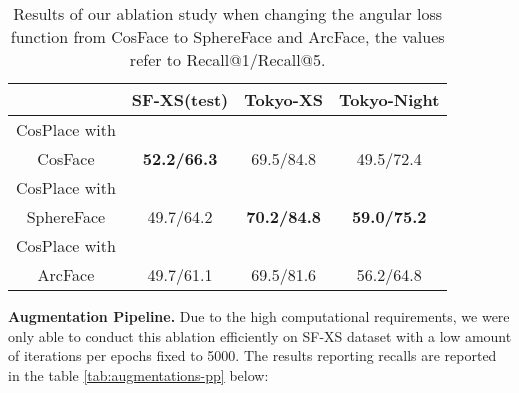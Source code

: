 \documentclass[10pt,twocolumn,letterpaper]{article}
\begin{document}
\begin{table}[htp]
  \centering
  \begin{tabular}{@{}cccc@{}}
    \toprule
     & SF-XS(test) & Tokyo-XS & Tokyo-Night\\
    \midrule
    CosPlace with\\ CosFace & \textbf{52.2/66.3} & 69.5/84.8 & 49.5/72.4 \\
    CosPlace with\\ SphereFace & 49.7/64.2 & \textbf{70.2/84.8} & \textbf{59.0/75.2} \\
    CosPlace with\\ ArcFace & 49.7/61.1 & 69.5/81.6 & 56.2/64.8\\
    \bottomrule
  \end{tabular}
  \caption{Results of our ablation study when changing the angular loss function from CosFace to SphereFace and ArcFace, the values refer to Recall@1/Recall@5.}
  \label{tab:lossablation}
\end{table}

\textbf{Augmentation Pipeline.}
Due to the high computational requirements, we were only able to conduct this ablation efficiently on SF-XS dataset with a low amount of iterations per epochs fixed to 5000. The results reporting recalls are reported in the table \ref{tab:augmentations-pp} below:

\end{document}
